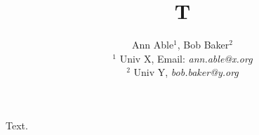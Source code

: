 \documentclass{article}
\begin{document}
\title{T}
\author{Ann Able$^1$, Bob Baker$^2$ \\
$^1$ Univ X, Email: \emph{ann.able@x.org} \\
$^2$ {\small Univ Y, \emph{bob.baker@y.org}}}
\maketitle
Text.
\end{document}
